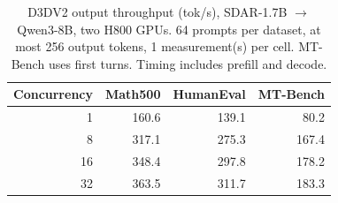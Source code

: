 \begin{table}[t]
\centering
\caption{D3DV2 output throughput (tok/s), SDAR-1.7B $\rightarrow$ Qwen3-8B, two H800 GPUs. 64 prompts per dataset, at most 256 output tokens, 1 measurement(s) per cell. MT-Bench uses first turns. Timing includes prefill and decode.}
\label{tab:d3dv2-concurrency}
\begin{tabular}{rrrr}
\hline
Concurrency & Math500 & HumanEval & MT-Bench \\
\hline
1 & 160.6 & 139.1 & 80.2 \\
8 & 317.1 & 275.3 & 167.4 \\
16 & 348.4 & 297.8 & 178.2 \\
32 & 363.5 & 311.7 & 183.3 \\
\hline
\end{tabular}
\end{table}

